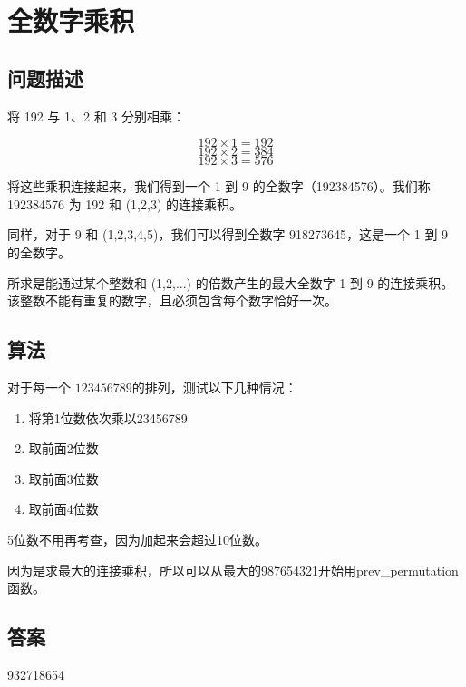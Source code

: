 \section{全数字乘积}\label{sec:problem38}
\subsection{问题描述}
\begin{tcolorbox}

将 192 与 1、2 和 3 分别相乘：

\[
192 \times 1 = 192
\]
\[
192 \times 2 = 384
\]
\[
192 \times 3 = 576
\]

将这些乘积连接起来，我们得到一个 1 到 9 的全数字（192384576）。我们称 192384576 为 192 和 (1,2,3) 的连接乘积。

同样，对于 9 和 (1,2,3,4,5)，我们可以得到全数字 918273645，这是一个 1 到 9 的全数字。

所求是能通过某个整数和 (1,2,...) 的倍数产生的最大全数字 1 到 9 的连接乘积。该整数不能有重复的数字，且必须包含每个数字恰好一次。
\end{tcolorbox}

\subsection{算法}
对于每一个 \( 123456789 \)的排列，测试以下几种情况：
\begin{enumerate}
	\item 将第1位数依次乘以23456789
	\item 取前面2位数
	\item 取前面3位数
	\item 取前面4位数
\end{enumerate}
5位数不用再考查，因为加起来会超过10位数。

因为是求最大的连接乘积，所以可以从最大的987654321开始用prev\_permutation函数。

\subsection{答案}
932718654
